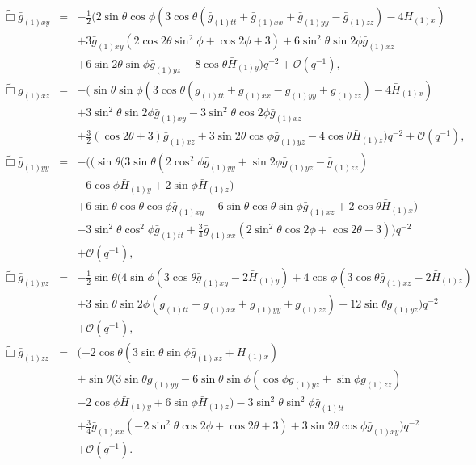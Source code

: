 \documentclass[a4paper,11pt]{article}
\numberwithin{equation}{section}
\begin{document}
\begin{eqnarray}
%
\label{eqn:efexy}
\tilde{\Box}\bar{g}_{(1)xy}&=&-\frac{1}{2} (2 \sin \theta  \cos \phi  (3 \cos \theta (\bar{g}_{(1)tt}+\bar{g}_{(1)xx}+\bar{g}_{(1)yy}-\bar{g}_{(1)zz})-4 \bar{H}_{(1) x}) \nonumber \\
&&+3 \bar{g}_{(1)xy} (2 \cos 2\theta  \sin ^2\phi +\cos 2 \phi +3)+6 \sin ^2\theta  \sin 2 \phi 
   \bar{g}_{(1)xz} \nonumber \\
   &&+6 \sin 2 \theta  \sin \phi  \bar{g}_{(1)yz}-8 \cos
   \theta  \bar{H}_{(1) y})    q^{-2} +\mathcal{O}(q^{-1}),\\
%
\label{eqn:efexz}
\tilde{\Box}\bar{g}_{(1)xz}&=&- (\sin \theta  \sin \phi  (3 \cos \theta  (\bar{g}_{(1)tt}+\bar{g}_{(1)xx}-\bar{g}_{(1)yy}+\bar{g}_{(1)zz})-4
   \bar{H}_{(1) x}) \nonumber \\
   &&+3 \sin ^2\theta \sin 2 \phi  \bar{g}_{(1)xy}-3 \sin
   ^2\theta  \cos 2 \phi  \bar{g}_{(1)xz} \nonumber \\
   &&+\frac{3}{2} (\cos 2 \theta +3)
   \bar{g}_{(1)xz}+3 \sin 2 \theta  \cos \phi  \bar{g}_{(1)yz}-4 \cos
   \theta  \bar{H}_{(1)z})    q^{-2} +\mathcal{O}(q^{-1}),\\
%
\label{eqn:efeyy}
\tilde{\Box}\bar{g}_{(1)yy}&=&-( (\sin \theta (3 \sin \theta  (2 \cos ^2\phi  \bar{g}_{(1)yy}+\sin 2 \phi  \bar{g}_{(1)yz}-\bar{g}_{(1)zz}) \nonumber \\
&&-6 \cos\phi \bar{H}_{(1) y}+2 \sin \phi  \bar{H}_{(1) z}) \nonumber \\
&&+6 \sin \theta \cos
   \theta \cos \phi  \bar{g}_{(1)xy}-6 \sin \theta  \cos \theta  \sin   \phi  \bar{g}_{(1)xz}+2 \cos \theta  \bar{H}_{(1) x}) \nonumber \\
   &&-3 \sin ^2\theta \cos ^2\phi  \bar{g}_{(1)tt}+\frac{3}{4} \bar{g}_{(1)xx} (2 \sin ^2\theta  \cos 2 \phi +\cos 2 \theta +3)  )  q^{-2} \nonumber \\
&&+\mathcal{O}(q^{-1}),\\
%
\label{eqn:efeyz}
\tilde{\Box}\bar{g}_{(1)yz}&=&-\frac{1}{2} \sin \theta (4 \sin \phi  (3 \cos \theta  \bar{g}_{(1)xy}-2 \bar{H}_{(1) y})+4 \cos \phi  (3 \cos \theta  \bar{g}_{(1)xz}-2 \bar{H}_{(1) z}) \nonumber \\
&&+3 \sin \theta  \sin 2 \phi  (\bar{g}_{(1)tt}-\bar{g}_{(1)xx}+\bar{g}_{(1)yy}+\bar{g}_{(1)zz})+12 \sin \theta  \bar{g}_{(1)yz})  q^{-2} \nonumber \\
&&+\mathcal{O}(q^{-1}),\\
%
\label{eqn:efezz}
\tilde{\Box}\bar{g}_{(1)zz}&=&(-2 \cos \theta  (3 \sin \theta  \sin \phi  \bar{g}_{(1)xz}+\bar{H}_{(1)x}) \nonumber \\
&&+ \sin \theta  (3 \sin \theta  \bar{g}_{(1)yy}-6 \sin\theta  \sin \phi  (\cos \phi  \bar{g}_{(1)yz}+\sin \phi 
   \bar{g}_{(1)zz}) \nonumber \\
   &&-2 \cos \phi  \bar{H}_{(1) y} +6 \sin \phi  \bar{H}_{(1)z}) -3  \sin ^2\theta  \sin ^2\phi  \bar{g}_{(1)tt} \nonumber \\
   &&+\frac{3}{4}  \bar{g}_{(1)xx} (-2 \sin ^2\theta  \cos 2 \phi +\cos 2 \theta
   +3) +3 \sin 2 \theta  \cos \phi  \bar{g}_{(1)xy})  q^{-2} \nonumber \\
&&+\mathcal{O}(q^{-1}).
\end{eqnarray}
\end{document}
